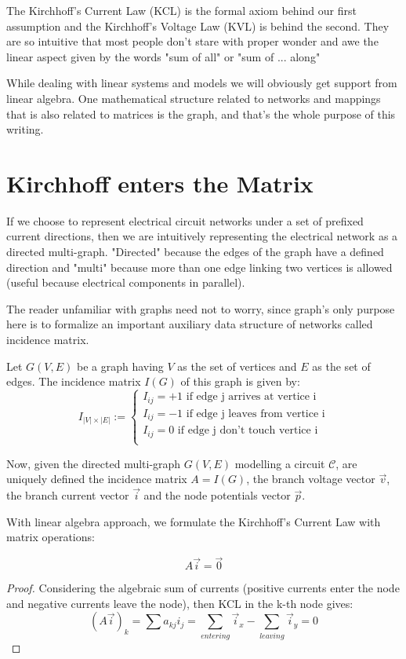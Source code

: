 \documentclass{comjnl}
\begin{document}
The Kirchhoff's Current Law (KCL) is the formal axiom behind our first assumption and the Kirchhoff's Voltage Law (KVL) is behind the second. They are so intuitive that most people don't stare with proper wonder and awe the linear aspect given by the words "sum of all" or "sum of ... along"

While dealing with linear systems and models we will obviously get support from linear algebra. One mathematical structure related to networks and mappings that is also related to matrices is the graph, and that's the whole purpose of this writing.

\section{Kirchhoff enters the Matrix}
If we choose to represent electrical circuit networks under a set of prefixed current directions, then we are intuitively representing the electrical network as a directed multi-graph. "Directed" because the edges of the graph have a defined direction and "multi" because more than one edge linking two vertices is allowed (useful because electrical components in parallel).

The reader unfamiliar with graphs need not to worry, since graph's only purpose here is to formalize an important auxiliary data structure of networks called incidence matrix.

\begin{definition}
Let $G(V,E)$ be a graph having $V$ as the set of vertices and $E$ as the set of edges. The incidence matrix $I(G)$ of this graph is given by:
$$ I_{|V|\times|E|} :=
\begin{cases} 
I_{ij}=+1 \mbox{ if edge j arrives at vertice i}\\
I_{ij}=-1 \mbox{ if edge j leaves from vertice i}\\
I_{ij}=0 \mbox{ if edge j don't touch vertice i}\\
\end{cases}$$
\end{definition}

Now, given the directed multi-graph $G(V,E)$ modelling a circuit $\mathcal{C}$, are uniquely defined the incidence matrix $A=I(G)$, the branch voltage vector $\vec{v}$, the branch current vector $\vec{i}$ and the node potentials vector $\vec{p}$.

With linear algebra approach, we formulate the Kirchhoff's Current Law with matrix operations:
\begin{theorem}[KCL]
\label{KCL:matrix}
$$A\vec{i} = \vec{0}$$
\end{theorem}
\begin{proof}
Considering the algebraic sum of currents (positive currents enter the node and negative currents leave the node), then KCL in the k-th node gives:
$$(A\vec{i})_k = \sum a_{kj}i_j = \sum_{entering} \vec{i}_x - \sum_{leaving} \vec{i}_y = 0 $$
\end{proof}
\end{document}
